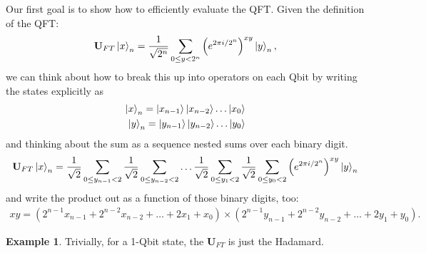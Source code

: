 \documentclass{book}
\theoremstyle{definition}
\newtheorem{exmp}{Example}[section]
\newcommand{\nn}{\nonumber}
\newcommand{\f}[2]{\frac{#1}{#2}}
\newcommand{\lp}{\left(}
\newcommand{\rp}{\right)}
\newcommand{\U}{\mathbf{U}}
\begin{document}
Our first goal is to show how to efficiently evaluate the QFT. Given the definition of the QFT:
\begin{align}
\U_{FT}\ket{x}_n =  \f{1}{\sqrt{2^n}} \sum_{0 \leq y < 2^n} \lp e^{2\pi i /2^n} \rp^{xy} \ket{y}_n,
\end{align}
we can think about how to break this up into operators on each Qbit by
writing the states explicitly as
\begin{align}
\ket{x}_n = \ket{x_{n-1}}\ket{x_{n-2}} \dots \ket{x_0}\nn\\
\ket{y}_n = \ket{y_{n-1}}\ket{y_{n-2}} \dots \ket{y_0}
\end{align}
and thinking about the sum as a sequence nested sums over each binary digit.
\begin{align}
\U_{FT}\ket{x}_n = \f{1}{\sqrt{2}}\sum_{0 \leq y_{n-1} < 2}\f{1}{\sqrt{2}}\sum_{0 \leq y_{n-2} < 2}\dots \f{1}{\sqrt{2}}\sum_{0 \leq y_{1} < 2}\f{1}{\sqrt{2}}\sum_{0 \leq y_{0} < 2} \lp e^{2\pi i /2^n} \rp^{xy}\ket{y}_n
\end{align}
and write the product out as a function of those binary digits, too:
\begin{align}
xy = (2^{n-1}x_{n-1} + 2^{n-2}x_{n-2} + \dots + 2x_1 + x_0)  \times (2^{n-1}y_{n-1} + 2^{n-2}y_{n-2} + \dots + 2y_1 + y_0) .
\end{align}


\begin{exmp}
	Trivially, for a 1-Qbit state, the $\U_{FT}$ is just the Hadamard.
\end{exmp}
\end{document}
